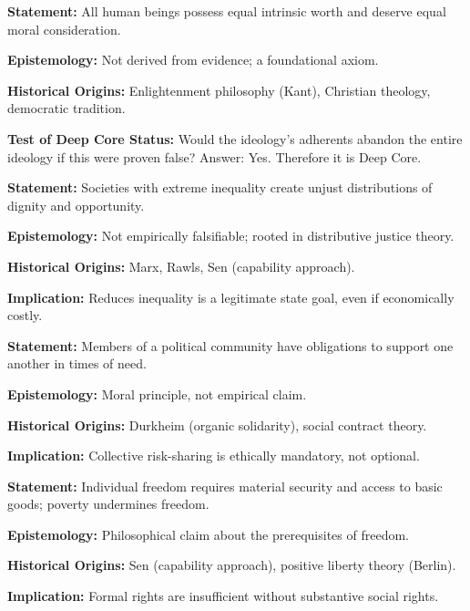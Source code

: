 \begin{tcolorbox}[colback=red!5!white, colframe=red!75!black,
    title=Deep Core Belief 1: Equal Moral Worth]

\textbf{Statement:} All human beings possess equal intrinsic worth and deserve equal moral consideration.

\textbf{Epistemology:} Not derived from evidence; a foundational axiom.

\textbf{Historical Origins:} Enlightenment philosophy (Kant), Christian theology, democratic tradition.

\textbf{Test of Deep Core Status:} Would the ideology's adherents abandon the entire ideology if this were proven false? Answer: Yes. Therefore it is Deep Core.

\end{tcolorbox}

\begin{tcolorbox}[colback=red!5!white, colframe=red!75!black,
    title=Deep Core Belief 2: Inequality Is Ethically Problematic]

\textbf{Statement:} Societies with extreme inequality create unjust distributions of dignity and opportunity.

\textbf{Epistemology:} Not empirically falsifiable; rooted in distributive justice theory.

\textbf{Historical Origins:} Marx, Rawls, Sen (capability approach).

\textbf{Implication:} Reduces inequality is a legitimate state goal, even if economically costly.

\end{tcolorbox}

\begin{tcolorbox}[colback=red!5!white, colframe=red!75!black,
    title=Deep Core Belief 3: Solidarity Is Obligatory]

\textbf{Statement:} Members of a political community have obligations to support one another in times of need.

\textbf{Epistemology:} Moral principle, not empirical claim.

\textbf{Historical Origins:} Durkheim (organic solidarity), social contract theory.

\textbf{Implication:} Collective risk-sharing is ethically mandatory, not optional.

\end{tcolorbox}

\begin{tcolorbox}[colback=red!5!white, colframe=red!75!black,
    title=Deep Core Belief 4: Material Conditions Enable Freedom]

\textbf{Statement:} Individual freedom requires material security and access to basic goods; poverty undermines freedom.

\textbf{Epistemology:} Philosophical claim about the prerequisites of freedom.

\textbf{Historical Origins:} Sen (capability approach), positive liberty theory (Berlin).

\textbf{Implication:} Formal rights are insufficient without substantive social rights.

\end{tcolorbox}

